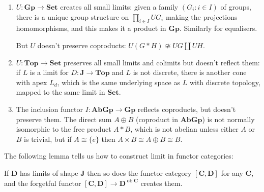 \documentclass[a4paper]{article}
\renewcommand{\c}[1]{\mathbf{#1}}
\DeclareMathOperator{\ob}{ob}
\newcommand{\Set}{{\c{Set}}}
\newcommand{\Top}{{\c{Top}}}
\begin{document}
\begin{eg}\leavevmode
  \begin{enumerate}
  \item \(U: \c{Gp} \to \Set\) creates all small limits: given a family \((G_i: i \in I)\) of groups, there is a unique group structure on \(\prod_{i \in I} UG_i\) making the projections homomorphisms, and this makes it a product in \(\c{Gp}\). Similarly for equalisers.

    But \(U\) doesn't preserve coproducts: \(U(G * H) \ncong UG \amalg UH\).
  \item \(U: \Top \to \Set\) preserves all small limits and colimits but doesn't reflect them: if \(L\) is a limit for \(D: \c J \to \Top\) and \(L\) is not discrete, there is another cone with apex \(L_d\), which is the same underlying space as \(L\) with discrete topology, mapped to the same limit in \(\Set\).
  \item The inclusion functor \(I: \c{AbGp} \to \c{Gp}\) reflects coproducts, but doesn't preserve them. The direct sum \(A \oplus B\) (coproduct in \(\c{AbGp}\)) is not normally isomorphic to the free product \(A * B\), which is not abelian unless either \(A\) or \(B\) is trivial, but if \(A \cong \{e\}\) then \(A \times B \cong A \oplus B \cong B\).
  \end{enumerate}
\end{eg}

The following lemma tells us how to construct limit in functor categories:

\begin{lemma}
  If \(\c D\) has limits of shape \(\c J\) then so does the functor category \([\c C, \c D]\) for any \(\c C\), and the forgetful functor \([\c C, \c D] \to \c D^{\ob \c C}\) creates them.
\end{lemma}
\end{document}
